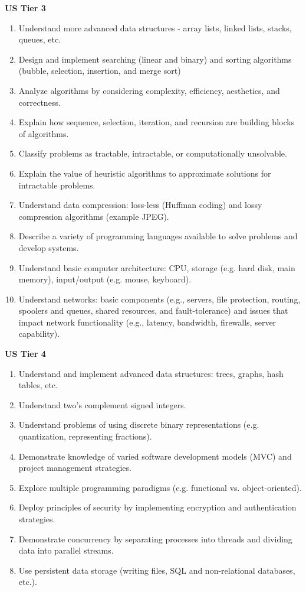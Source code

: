 \textbf{US Tier 3}
\begin{enumerate} %
	\item Understand more advanced data structures - array lists, linked lists, stacks, queues, etc.
	\item Design and implement searching (linear and binary) and sorting algorithms (bubble, selection, insertion, and merge sort)
	\item Analyze algorithms by considering complexity, efficiency, aesthetics, and correctness.
	\item Explain how sequence, selection, iteration, and recursion are building blocks of algorithms. 
	\item Classify problems as tractable, intractable, or computationally unsolvable.
	\item Explain the value of heuristic algorithms to approximate solutions for intractable problems.
	\item Understand data compression: loss-less (Huffman coding) and lossy compression algorithms (example JPEG).
	\item Describe a variety of programming languages available to solve problems and develop systems.
	\item Understand basic computer architecture: CPU, storage (e.g. hard disk, main memory), input/output (e.g. mouse, keyboard).
	\item Understand networks: basic components (e.g., servers, file protection, routing, spoolers and queues, shared resources, and fault-tolerance) and issues that impact network functionality (e.g., latency, bandwidth, firewalls, server capability).
\end{enumerate}

\textbf{US Tier 4}
\begin{enumerate}
	\item Understand and implement advanced data structures: trees, graphs, hash tables, etc.
	\item Understand two’s complement signed integers.
	\item Understand problems of using discrete binary representations (e.g. quantization, representing fractions).
	\item Demonstrate knowledge of varied software development models (MVC) and project management strategies.
	\item Explore multiple programming paradigms (e.g. functional vs. object-oriented).
	\item Deploy principles of security by implementing encryption and authentication strategies.
	\item Demonstrate concurrency by separating processes into threads and dividing data into parallel streams.
	\item Use persistent data storage (writing files, SQL and non-relational databases, etc.).
\end{enumerate}